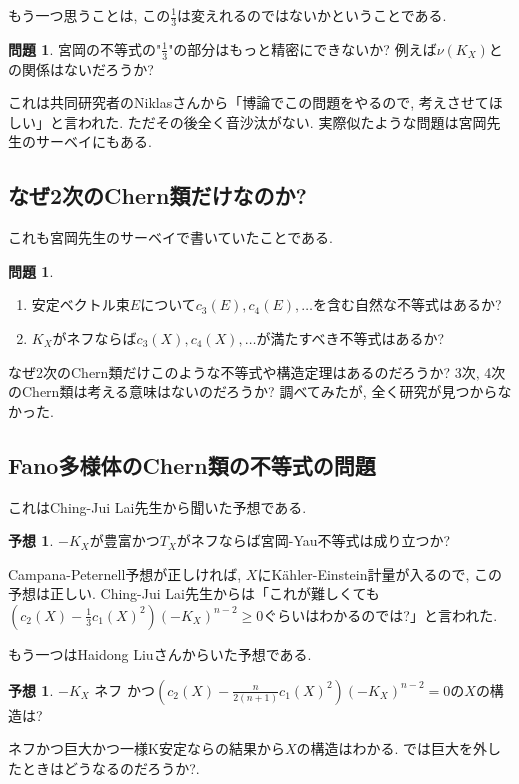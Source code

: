 \documentclass[dvipdfmx]{msjproc}
\theoremstyle{definition}
\newtheorem{conj}[thm]{予想}
\newtheorem{ques}[thm]{問題}
\begin{document}
もう一つ思うことは, この$\frac{1}{3}$は変えれるのではないかということである. 
\begin{ques}
宮岡の不等式の"$\frac{1}{3}$"の部分はもっと精密にできないか?
例えば$\nu(K_X)$との関係はないだろうか?
\end{ques}
これは共同研究者のNiklasさんから「博論でこの問題をやるので, 考えさせてほしい」と言われた. 
ただその後全く音沙汰がない. 
実際似たような問題は宮岡先生のサーベイ\cite[p.28]{MiySurOka}にもある. 

\subsection{なぜ2次のChern類だけなのか?}
これも宮岡先生のサーベイ\cite{MiySur}で書いていたことである.
\begin{ques}\cite[問題 4.1]{MiySur}
\begin{enumerate}
  \setlength{\parskip}{0cm} 
  \setlength{\itemsep}{0cm} 
\item 安定ベクトル束$E$について$c_3(E), c_4(E),\ldots$を含む自然な不等式はあるか?
\item $K_X$がネフならば$c_3(X), c_4(X),\ldots$が満たすべき不等式はあるか?
\end{enumerate}
\end{ques}
なぜ2次のChern類だけこのような不等式や構造定理はあるのだろうか?
3次, 4次のChern類は考える意味はないのだろうか?
調べてみたが, 全く研究が見つからなかった. 




\subsection{Fano多様体のChern類の不等式の問題}
これはChing-Jui Lai先生から聞いた予想である. 
\begin{conj}
$-K_X$が豊富かつ$T_X$がネフならば宮岡-Yau不等式は成り立つか?
\end{conj}
Campana-Peternell予想が正しければ, $X$にK\"ahler-Einstein計量が入るので, この予想は正しい. 
Ching-Jui Lai先生からは「これが難しくても$\left(c_2(X) - \frac{1}{3}c_1(X)^{2} \right) (-K_{X})^{n-2}\ge 0$ぐらいはわかるのでは?」と言われた. 

もう一つはHaidong Liuさんからいた予想である. 
\begin{conj}
$-K_X$ ネフ かつ$\left(c_2(X) - \frac{n}{2(n+1)}c_1(X)^{2} \right)(-K_{X})^{n-2}=0$の$X$の構造は?
\end{conj}
ネフかつ巨大かつ一様K安定なら\cite{Hisa24}の結果から$X$の構造はわかる.
では巨大を外したときはどうなるのだろうか?.
\end{document}
